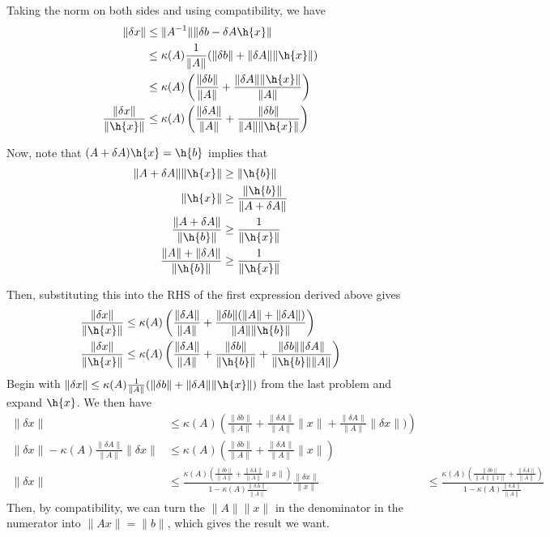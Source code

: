 \documentclass{article}
\begin{document}
Taking the norm on both sides and using compatibility, we have
\begin{align*}
    \|\delta x\|&\leq\|A^{-1}\|\|\delta b-\delta A\h{x}\|\\
    &\leq\kappa(A)\frac{1}{\|A\|}(\|\delta b\|+\|\delta A\|\|\h{x}\|)\\
    &\leq\kappa(A)\left(\frac{\|\delta b\|}{\|A\|} + \frac{\|\delta A\|\|\h{x}\|}{\|A\|}\right)\\
    \frac{\|\delta x\|}{\|\h{x}\|}&\leq\kappa(A)\left(\frac{\|\delta A\|}{\|A\|}+\frac{\|\delta b\|}{\|A\|\|\h{x}\|}\right)\\
\end{align*}

Now, note that $(A+\delta A)\h{x}=\h{b}$ implies that
\begin{align*}
    \|A+\delta A\|\|\h{x}\|&\geq\|\h{b}\|\\
    \|\h{x}\|&\geq\frac{\|\h{b}\|}{\|A+\delta A\|}\\
    \frac{\|A+\delta A\|}{\|\h{b}\|}&\geq\frac{1}{\|\h{x}\|}\\
    \frac{\|A\|+\|\delta A\|}{\|\h{b}\|}&\geq\frac{1}{\|\h{x}\|}
\end{align*}

Then, substituting this into the RHS of the first expression derived above gives
\begin{align*}
    \frac{\|\delta x\|}{\|\h{x}\|}&\leq\kappa(A)\left(\frac{\|\delta A\|}{\|A\|}+\frac{\|\delta b\|(\|A\|+\|\delta A\|)}{\|A\|\|\h{b}\|}\right)\\
    \frac{\|\delta x\|}{\|\h{x}\|}&\leq\kappa(A)\left(\frac{\|\delta A\|}{\|A\|}+\frac{\|\delta b\|}{\|\h{b}\|}+\frac{\|\delta b\|\|\delta A\|}{\|\h{b}\|\|A\|}\right)\\
\end{align*}
Begin with $\|\delta x\|\leq\kappa(A)\frac{1}{\|A\|}(\|\delta b\|+\|\delta A\|\|\h{x}\|)$ from the last problem and expand $\h{x}$. We then have
\begin{align*}
    \|\delta x\|&\leq\kappa(A)\left(\frac{\|\delta b\|}{\|A\|}+\frac{\|\delta A\|}{\|A\|}\|x\|+\frac{\|\delta A\|}{\|A\|}\|\delta x\|)\right)\\
    \|\delta x\|-\kappa(A)\frac{\|\delta A\|}{\|A\|}\|\delta x\|&\leq\kappa(A)\left(\frac{\|\delta b\|}{\|A\|}+\frac{\|\delta A\|}{\|A\|}\|x\|\right)\\
    \|\delta x\|&\leq\frac{\kappa(A)\left(\frac{\|\delta b\|}{\|A\|}+\frac{\|\delta A\|}{\|A\|}\|x\|\right)}{1-\kappa(A)\frac{\|\delta A\|}{\|A\|}}
    \frac{\|\delta x\|}{\|x\|}&\leq\frac{\kappa(A)\left(\frac{\|\delta b\|}{\|A\|\|x\|}+\frac{\|\delta A\|}{\|A\|}\right)}{1-\kappa(A)\frac{\|\delta A\|}{\|A\|}}
\end{align*}
Then, by compatibility, we can turn the $\|A\|\|x\|$ in the denominator in the numerator into $\|Ax\|=\|b\|$, which gives the result we want.
\end{document}

